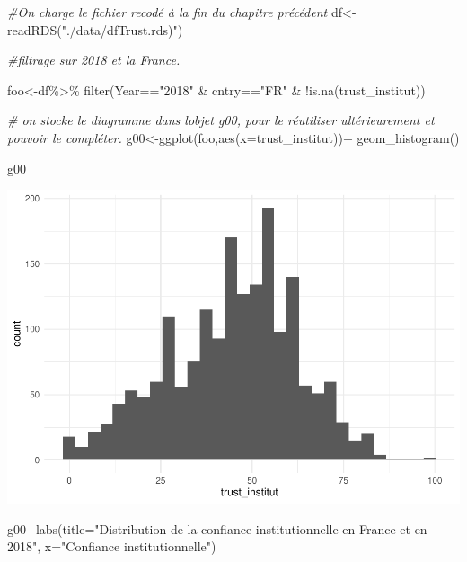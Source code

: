 \documentclass[
]{book}
\newenvironment{Shaded}{\begin{snugshade}}{\end{snugshade}}
\newcommand{\AttributeTok}[1]{\textcolor[rgb]{0.77,0.63,0.00}{#1}}
\newcommand{\CommentTok}[1]{\textcolor[rgb]{0.56,0.35,0.01}{\textit{#1}}}
\newcommand{\FunctionTok}[1]{\textcolor[rgb]{0.00,0.00,0.00}{#1}}
\newcommand{\NormalTok}[1]{#1}
\newcommand{\OtherTok}[1]{\textcolor[rgb]{0.56,0.35,0.01}{#1}}
\newcommand{\SpecialCharTok}[1]{\textcolor[rgb]{0.00,0.00,0.00}{#1}}
\newcommand{\StringTok}[1]{\textcolor[rgb]{0.31,0.60,0.02}{#1}}
\begin{document}
\begin{Shaded}
\begin{Highlighting}[]
\CommentTok{\#On charge le fichier recodé à la fin du chapitre précédent}
\NormalTok{df}\OtherTok{\textless{}{-}}\FunctionTok{readRDS}\NormalTok{(}\StringTok{"./data/dfTrust.rds)"}\NormalTok{)}

\CommentTok{\#filtrage sur 2018 et la France.}

\NormalTok{foo}\OtherTok{\textless{}{-}}\NormalTok{df}\SpecialCharTok{\%\textgreater{}\%}
  \FunctionTok{filter}\NormalTok{(Year}\SpecialCharTok{==}\StringTok{"2018"} \SpecialCharTok{\&}\NormalTok{ cntry}\SpecialCharTok{==}\StringTok{"FR"} \SpecialCharTok{\&} \SpecialCharTok{!}\FunctionTok{is.na}\NormalTok{(trust\_institut)) }

\CommentTok{\# on stocke le diagramme dans l\textquotesingle{}objet g00, pour le réutiliser ultérieurement et pouvoir le compléter.}
\NormalTok{g00}\OtherTok{\textless{}{-}}\FunctionTok{ggplot}\NormalTok{(foo,}\FunctionTok{aes}\NormalTok{(}\AttributeTok{x=}\NormalTok{trust\_institut))}\SpecialCharTok{+}
  \FunctionTok{geom\_histogram}\NormalTok{()}

\NormalTok{g00}
\end{Highlighting}
\end{Shaded}

\includegraphics{bookdown-demo_files/figure-latex/302-1.pdf}

\begin{Shaded}
\begin{Highlighting}[]
\NormalTok{g00}\SpecialCharTok{+}\FunctionTok{labs}\NormalTok{(}\AttributeTok{title=}\StringTok{"Distribution de la confiance institutionnelle en France et en 2018"}\NormalTok{,}
         \AttributeTok{x=}\StringTok{"Confiance institutionnelle"}\NormalTok{)}
\end{Highlighting}
\end{Shaded}
\end{document}
